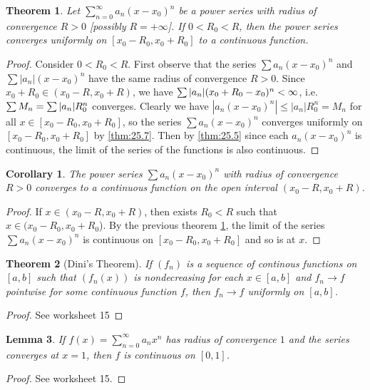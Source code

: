 \documentclass[12pt, lettersize]{book}
\theoremstyle{plain}
\newtheorem{thm}{Theorem}[section]
\newtheorem{lem}[thm]{Lemma}
\newtheorem{cor}{Corollary}[thm]
\theoremstyle{definition}
\theoremstyle{remark}
\begin{document}
			\begin{thm}\label{thm:26.1}
				Let $\sum_{n=0}^{\infty}a_n(x-x_0)^n$ be a power series with radius of convergence $R>0$ [possibly $R=+\infty$]. If $0<R_0<R$, then the power series converges uniformly on $[x_0-R_0, x_0+R_0]$ to a continuous function.
			\end{thm}
			\begin{proof}
				Consider $0<R_0<R$. First observe that the series $\sum a_n(x-x_0)^n$ and $\sum|a_n|(x-x_0)^n$ have the same radius of convergence $R>0$. Since $x_0+R_0\in(x_0-R,x_0+R)$, we have $\sum \abs{a_n}(x_0+R_0-x_0)^n<\infty$, i.e. $\sum M_n=\sum\abs{a_n}R_0^n$ converges. Clearly we have $|a_n(x-x_0)^n|\leq|a_n|R_0^n=M_n$ for all $x\in[x_0-R_0,x_0+R_0]$, so the series $\sum a_n(x-x_0)^n$ converges uniformly on $[x_0-R_0,x_0+R_0]$ by \ref{thm:25.7}. Then by \ref{thm:25.5} since each $a_n(x-x_0)^n$ is continuous, the limit of the series of the functions is also continuous.
			\end{proof}
			\begin{cor}\label{cor:26.2}
				The power series $\sum a_n(x-x_0)^n$ with radius of convergence $R>0$ converges to a continuous function on the open interval $(x_0-R,x_0+R)$.
			\end{cor}
			\begin{proof}
				If $x\in(x_0-R,x_0+R)$, then exists $R_0<R$ such that $x\in(x_0-R_0,x_0+R_0$). By the previous theorem \ref{thm:26.1}, the limit of the series $\sum a_n(x-x_0)^n$ is continuous on $[x_0-R_0,x_0+R_0]$ and so is at $x$. 
			\end{proof}
			
			\begin{thm}[Dini's Theorem]
			If $(f_n)$ is a sequence of continous functions on $[a,b]$ such that $(f_n(x))$ is nondecreasing for each $x\in[a,b]$ and $f_n\rightarrow f$ pointwise for some continuous function $f$, then $f_n\rightarrow f$ uniformly on $[a,b]$.
			\end{thm}
			\begin{proof}
				See worksheet 15
			\end{proof}
			
			\begin{lem}
			If $f(x)=\sum_{n=0}^{\infty}a_nx^n$ has radius of convergence $1$ and the series converges at $x=1$, then $f$ is continuous on $[0,1]$.
			\end{lem}
			\begin{proof}
				See worksheet 15.
			\end{proof}
			
\end{document}
